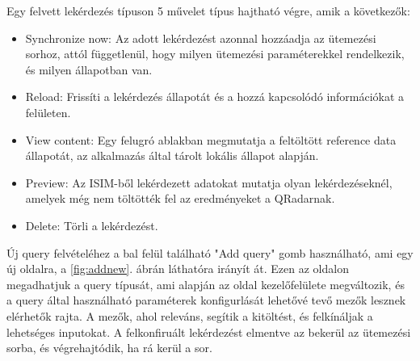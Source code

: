 Egy felvett lekérdezés típuson 5 művelet típus hajtható végre, amik a következők:
\begin{itemize}
	\item Synchronize now: Az adott lekérdezést azonnal hozzáadja az ütemezési sorhoz, attól függetlenül, hogy milyen ütemezési paraméterekkel rendelkezik, és milyen állapotban van.
	\item Reload: Frissíti a lekérdezés állapotát és a hozzá kapcsolódó információkat a felületen.
	\item View content: Egy felugró ablakban megmutatja a feltöltött reference data állapotát, az alkalmazás által tárolt lokális állapot alapján.
	\item Preview: Az ISIM-ből lekérdezett adatokat mutatja olyan lekérdezéseknél, amelyek még nem töltötték fel az eredményeket a QRadarnak.
	\item Delete: Törli a lekérdezést.
\end{itemize}

Új query felvételéhez a bal felül található "Add query" gomb használható, ami egy új oldalra, a \ref{fig:addnew}. ábrán láthatóra irányít át. Ezen az oldalon megadhatjuk a query típusát, ami alapján az oldal kezelőfelülete megváltozik, és a query által használható paraméterek konfigurlását lehetővé tevő mezők lesznek elérhetők rajta. A mezők, ahol releváns, segítik a kitöltést, és felkínáljak a lehetséges inputokat. A felkonfiruált lekérdezést elmentve az bekerül az ütemezési sorba, és végrehajtódik, ha rá kerül a sor.



